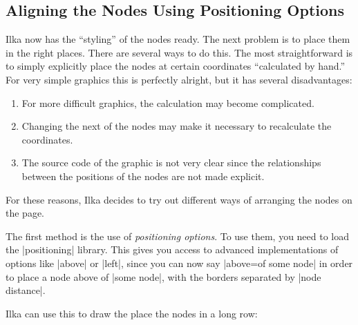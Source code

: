 \subsection{Aligning  the Nodes Using Positioning Options}

Ilka now has the ``styling'' of the nodes ready. The next problem is
to place them in the right places. There are several ways to do
this. The most straightforward is to simply explicitly place the nodes
at certain coordinates ``calculated by hand.'' For very simple
graphics this is perfectly alright, but it has several disadvantages:
\begin{enumerate}
\item For more difficult graphics, the calculation may become
  complicated.
\item Changing the next of the nodes may make it necessary to
  recalculate the coordinates.
\item The source code of the graphic is not very clear since the
  relationships between the positions of the nodes are not made
  explicit. 
\end{enumerate}

For these reasons, Ilka decides to try out different ways of arranging
the nodes on the page.

The first method is the use of \emph{positioning options}. To use
them, you need to load the |positioning| library. This gives you
access to advanced implementations of options like |above| or |left|,
since you can now say |above=of some node| in order to place a node
above of |some node|, with the borders separated by |node distance|.

Ilka can use this to draw the place the nodes in a long row:
\begin{codeexample}[]
\end{codeexample}

